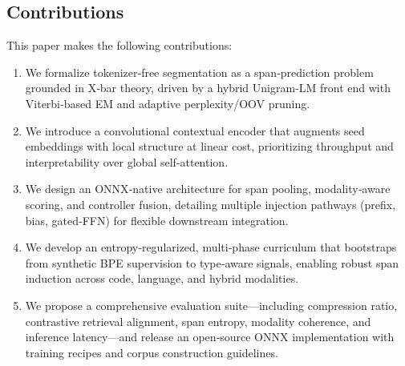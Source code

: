 \subsection{Contributions}

This paper makes the following contributions:
\begin{enumerate}
	\item We formalize tokenizer‐free segmentation as a span‐prediction problem grounded in X‐bar theory, driven by a hybrid Unigram‐LM front end with Viterbi‐based EM and adaptive perplexity/OOV pruning.
	\item We introduce a convolutional contextual encoder that augments seed embeddings with local structure at linear cost, prioritizing throughput and interpretability over global self‐attention.
	\item We design an ONNX‐native architecture for span pooling, modality‐aware scoring, and controller fusion, detailing multiple injection pathways (prefix, bias, gated‐FFN) for flexible downstream integration.
	\item We develop an entropy‐regularized, multi‐phase curriculum that bootstraps from synthetic BPE supervision to type‐aware signals, enabling robust span induction across code, language, and hybrid modalities.
	\item We propose a comprehensive evaluation suite—including compression ratio, contrastive retrieval alignment, span entropy, modality coherence, and inference latency—and release an open‐source ONNX implementation with training recipes and corpus construction guidelines.
\end{enumerate}